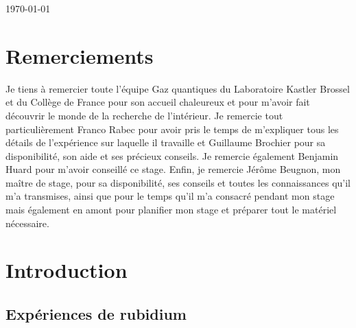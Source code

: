 \documentclass[11pt,a4paper]{article}
\begin{document}
\begin{@empty}
\begin{center}
\end{center}

\vspace{-0.2cm}

\vfill
\hfill \today

\end{@empty}

\newpage

\thispagestyle{empty}
\section*{Remerciements}

Je tiens à remercier toute l'équipe Gaz quantiques du Laboratoire Kastler Brossel et du Collège de France pour son accueil chaleureux et pour m'avoir fait découvrir le monde de la recherche de l'intérieur. Je remercie tout particulièrement Franco Rabec pour avoir pris le temps de m'expliquer tous les détails de l'expérience sur laquelle il travaille et Guillaume Brochier pour sa disponibilité, son aide et ses précieux conseils. Je remercie également Benjamin Huard pour m'avoir conseillé ce stage. Enfin, je remercie Jérôme Beugnon, mon maître de stage, pour sa disponibilité, ses conseils et toutes les connaissances qu'il m'a transmises, ainsi que pour le temps qu'il m'a consacré pendant mon stage mais également en amont pour planifier mon stage et préparer tout le matériel nécessaire. 
\tableofcontents
\newpage


\setcounter{page}{1}


\setlength{\parindent}{16pt}

\section{Introduction}


\subsection{Expériences de rubidium}

\end{document}
